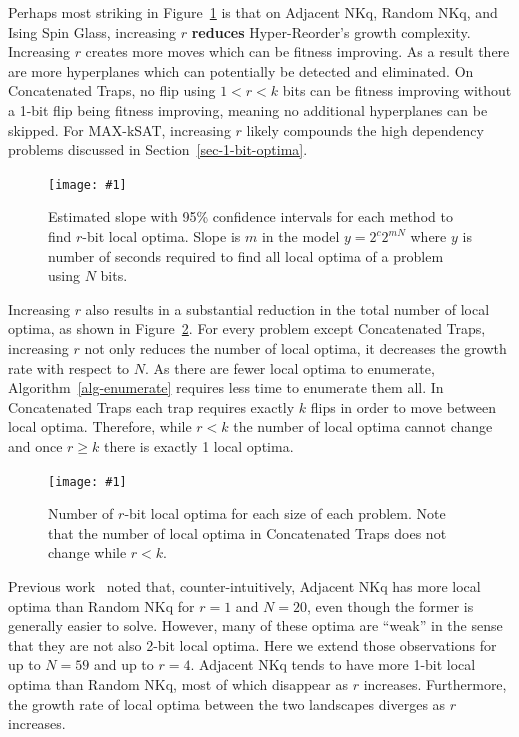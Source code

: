 \documentclass[runningheads,a4paper]{llncs}
\newcommand{\includegraphicsfit}[1]
{\texttt{[image: \#1]}}
\begin{document}
Perhaps most striking in Figure~\ref{fig-slope-method} is that on Adjacent NKq, Random NKq,
and Ising Spin Glass, increasing $r$ \textbf{reduces} Hyper-Reorder's growth complexity.
Increasing $r$ creates more moves which can be fitness improving. As a result there
are more hyperplanes which can potentially be detected and eliminated.
On Concatenated Traps, no flip using $1 < r < k$ bits can be fitness improving
without a 1-bit flip being fitness improving, meaning no additional hyperplanes can be skipped.
For MAX-kSAT, increasing $r$ likely compounds the high dependency problems discussed in
Section~\ref{sec-1-bit-optima}.

\begin{figure}
  \centering
  \includegraphicsfit{slope-method}
  \caption{Estimated slope with 95\% confidence intervals for each method to find $r$-bit local optima. Slope is $m$ in the model $y = 2^c2^{mN}$
           where $y$ is number of seconds required to
	         find all local optima of a problem using $N$ bits.}
  \label{fig-slope-method}
\end{figure}

Increasing $r$ also results in a substantial reduction in the
total number of local optima, as shown in Figure~\ref{fig-length-radius}.
For every problem except Concatenated Traps, increasing $r$ not only reduces the
number of local optima, it decreases the growth rate with respect to $N$. As there
are fewer local optima to enumerate, Algorithm~\ref{alg-enumerate} requires less
time to enumerate them all. In Concatenated Traps each trap requires exactly $k$ flips in
order to move between local optima. Therefore, while $r < k$ the number of local optima
cannot change and once $r \ge k$ there is exactly 1 local optima.

\begin{figure}
  \centering
  \includegraphicsfit{length-radius}
  \caption{Number of $r$-bit local optima for each size of each problem. Note that
           the number of local optima in Concatenated Traps does not change while $r<k$.}
  \label{fig-length-radius}
\end{figure}

Previous work~\cite{ochoa:2015:crossovernetworks} noted that, counter-intuitively, Adjacent
NKq has more local optima than Random NKq for $r=1$ and $N=20$, even though the former is generally
easier to solve. However, many of these optima are ``weak'' in the sense that they are not also
2-bit local optima. Here we extend those observations for up to $N=59$ and up to $r=4$. Adjacent
NKq tends to have more 1-bit local optima than Random NKq, most of which disappear as $r$
increases. Furthermore, the growth rate of local optima between the two landscapes diverges
as $r$ increases.
\end{document}
